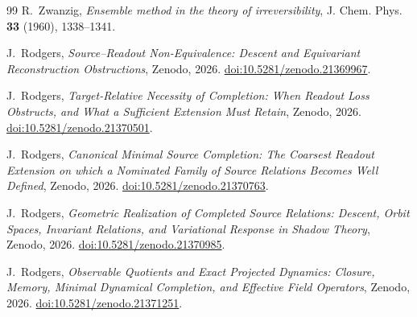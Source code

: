\documentclass[11pt,reqno]{amsart}
\theoremstyle{plain}
\theoremstyle{definition}
\theoremstyle{remark}
\begin{document}
\begin{thebibliography}{99}
R.~Zwanzig,
\emph{Ensemble method in the theory of irreversibility},
J. Chem. Phys. \textbf{33} (1960), 1338--1341.

J.~Rodgers,
\emph{Source--Readout Non-Equivalence: Descent and Equivariant Reconstruction Obstructions},
Zenodo, 2026.
\href{https://doi.org/10.5281/zenodo.21369967}{doi:10.5281/zenodo.21369967}.

J.~Rodgers,
\emph{Target-Relative Necessity of Completion: When Readout Loss Obstructs, and What a Sufficient
Extension Must Retain},
Zenodo, 2026.
\href{https://doi.org/10.5281/zenodo.21370501}{doi:10.5281/zenodo.21370501}.

J.~Rodgers,
\emph{Canonical Minimal Source Completion: The Coarsest Readout Extension on which a Nominated
Family of Source Relations Becomes Well Defined},
Zenodo, 2026.
\href{https://doi.org/10.5281/zenodo.21370763}{doi:10.5281/zenodo.21370763}.

J.~Rodgers,
\emph{Geometric Realization of Completed Source Relations: Descent, Orbit Spaces, Invariant
Relations, and Variational Response in Shadow Theory},
Zenodo, 2026.
\href{https://doi.org/10.5281/zenodo.21370985}{doi:10.5281/zenodo.21370985}.

J.~Rodgers,
\emph{Observable Quotients and Exact Projected Dynamics: Closure, Memory, Minimal Dynamical
Completion, and Effective Field Operators},
Zenodo, 2026.
\href{https://doi.org/10.5281/zenodo.21371251}{doi:10.5281/zenodo.21371251}.

\end{thebibliography}
\end{document}
